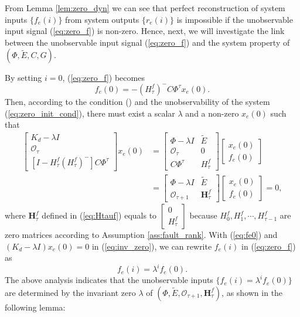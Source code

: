 \documentclass[twocolumn]{autart}
\begin{document}
From Lemma \ref{lem:zero_dyn} we can see that perfect reconstruction of system inputs $\{f_e(i)\}$ from system outputs $\{r_e(i)\}$ is impossible if the unobservable input signal (\ref{eq:zero_f}) is non-zero. Hence, next, we will investigate the link between the unobservable input signal (\ref{eq:zero_f}) and the system property of $(\Phi, \tilde E, C, G )$.


By setting $i=0$, (\ref{eq:zero_f}) becomes 
\begin{equation}\label{eq:fe0}
f_{e}(0) = - \left( H_\tau^f \right)^- C \Phi^\tau x_{e}(0).
\end{equation}
Then, according to the condition () and the unobservability of the system (\ref{eq:zero_init_cond}), there must exist a scalar $\lambda$ and a non-zero $x_e(0)$ such that \cite{Zhoubook1996}
\begin{equation}\label{eq:inv_zero}
\begin{aligned}
\left[
\begin{smallmatrix}
K_d - \lambda I \\
\mathcal{O}_\tau \\
\left[ I - H_\tau^f \left( H_\tau^f \right)^- \right] C  \Phi^\tau
\end{smallmatrix}
\right] x_e(0) &= \left[ \begin{smallmatrix}
\Phi-\lambda I  & \tilde E \\
\mathcal{O}_\tau & 0 \\
C  \Phi^\tau & H_\tau^f
\end{smallmatrix} \right] \!
\left[ \begin{smallmatrix}
x_{e}(0) \\
f_{e}(0)
\end{smallmatrix} \right]  \\
&= \left[ \begin{smallmatrix}
\Phi-\lambda I  & \tilde E \\
\mathcal{O}_{\tau+1} & \mathbf{H}_\tau^f
\end{smallmatrix} \right] \!
\left[ \begin{smallmatrix}
x_{e}(0) \\
f_{e}(0)
\end{smallmatrix} \right] = 0,
\end{aligned}
\end{equation} 
where $\mathbf{H}_\tau^f$ defined in (\ref{eq:Htauf}) equals to $\left[\begin{smallmatrix}
0 \\ H_\tau^f
\end{smallmatrix}\right]$ because $H_0^f, H_1^f, \cdots, H_{\tau-1}^f$ are zero matrices according to Assumption \ref{ass:fault_rank}.
With (\ref{eq:fe0}) and $(K_d - \lambda I) x_e(0) = 0$ in (\ref{eq:inv_zero}), we can rewrite $f_e(i)$ in (\ref{eq:zero_f}) as
\begin{equation}\label{eq:fei}
f_e(i) = \lambda^i f_e(0). 
\end{equation}
The above analysis indicates that the unobservable inputs $\{f_e(i) = \lambda^i f_e(0)\}$ are determined by the invariant zero $\lambda$ of 
$( \Phi, \tilde E, \mathcal{O}_{\tau+1}, \mathbf{H}_{\tau}^f )$, as shown in the following lemma:
\end{document}
